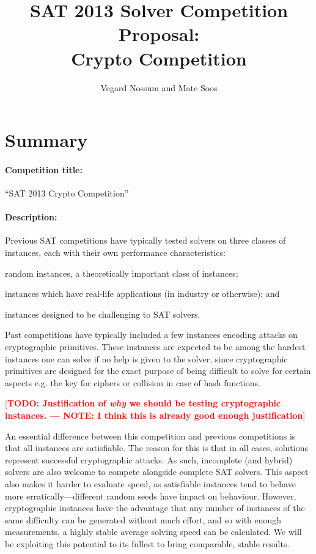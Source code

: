 \documentclass[12pt, a4paper]{article}
\title{SAT 2013 Solver Competition Proposal: \\ Crypto Competition}
\author{Vegard Nossum and Mate Soos}
\newcommand{\XXX}[1]{\textcolor{red}{[\textbf{#1}]}}
\begin{document}
\maketitle


\section{Summary}

\paragraph{Competition title:} “SAT 2013 Crypto Competition”

\paragraph{Description:}
Previous SAT competitions have typically tested solvers on three classes of instances, each with their own performance characteristics:
\begin{inparaenum}
\item random instances, a theoretically important class of instances;
\item instances which have real-life applications (in industry or otherwise); and
\item instances designed to be challenging to SAT solvers.
\end{inparaenum}

Past competitions have typically included a few instances encoding attacks on cryptographic primitives. These instances are expected to be among the hardest instances one can solve if no help is given to the solver, since cryptographic primitives are designed for the exact purpose of being difficult to solve for certain aspects e.g. the key for ciphers or collision in case of hash functions.

\XXX{TODO: Justification of \emph{why} we should be testing cryptographic instances. --- NOTE: I think this is already good enough justification}

An essential difference between this competition and previous competitions is that all instances are satisfiable. The reason for this is that in all cases, solutions represent successful cryptographic attacks. As such, incomplete (and hybrid) solvers are also welcome to compete alongside complete SAT solvers. This aspect also makes it harder to evaluate speed, as satisfiable instances tend to behave more erratically---different random seeds have impact on behaviour. However, cryptographic instances have the advantage that any number of instances of the same difficulty can be generated without much effort, and so with enough measurements, a highly stable average solving speed can be calculated. We will be exploiting this potential to its fullest to bring comparable, stable results.
\end{document}
